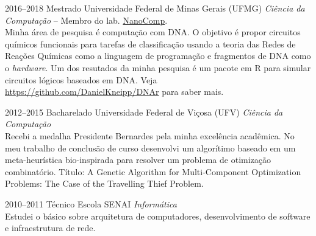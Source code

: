 \documentclass[a4paper]{cv-friggeri-x}
\begin{document}
\begin{entrylist}

\entry
    {2016--2018}
    {Mestrado}
    {Universidade Federal de Minas Gerais (UFMG)}
    {\emph{Ciência da Computação} -- 
    \footnotesize{Membro do lab. \href{http://www.nanocomp.dcc.ufmg.br/}{NanoComp}.}\\
    \normalsize{Minha área de pesquisa é computação com DNA. O objetivo é propor circuitos químicos funcionais para tarefas de classificação usando a teoria das Redes de Reações Químicas como a linguagem de programação e fragmentos de DNA como o \textit{hardware}. Um dos resutados da minha pesquisa é um pacote em R para simular circuitos lógicos baseados em DNA. Veja \href{https://github.com/DanielKneipp/DNAr}{https://github.com/DanielKneipp/DNAr} para saber mais.}}

\entry
    {2012--2015}
    {Bacharelado}
    {Universidade Federal de Vi\c cosa (UFV)}
    {\emph{Ciência da Computação}\\
    Recebi a medalha Presidente Bernardes pela minha excelência acadêmica. No meu trabalho de conclusão de curso desenvolvi um algorítimo baseado em um meta-heurística bio-inspirada para resolver um problema de otimização combinatório. Título: A Genetic Algorithm for Multi-Component Optimization Problems: The Case of the Travelling Thief Problem.}


\entry
    {2010--2011}
    {Técnico}
    {Escola SENAI}
    {\emph{Informática}\\
    Estudei o básico sobre arquitetura de computadores, desenvolvimento de software e infraestrutura de rede.}



\end{entrylist}

\end{document}
